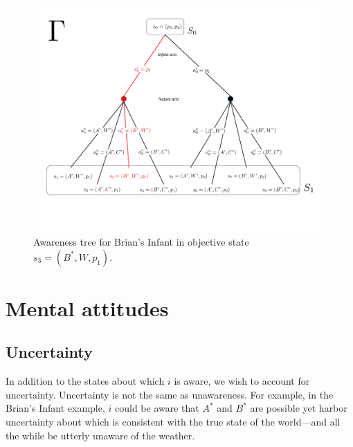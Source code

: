 \documentclass[
11pt,
titlepage,
reqno,
]{article}%
\theoremstyle{definition}
\begin{document}
{\begin{figure}[h!]
	\centering
	\includegraphics*[page=2,trim = 0in 0in 0in 0in,scale=.6]{Awareness_Diagrams_All}
	\caption{Awareness tree for Brian's Infant in objective state $s_{3}=(B^\ast,W,p_1)$.\label{Diag: p-02}}%
\end{figure}
}

	
\section{Mental attitudes}
	
\subsection{Uncertainty}
	
In addition to the states about which $i$ is aware, we wish to account for uncertainty. 
Uncertainty is not the same as unawareness.
For example, in the Brian's Infant example, $i$ could be aware that $A^\ast$ and $B^\ast$ are possible yet harbor uncertainty about which is consistent with the true state of the world---and all the while be utterly unaware of the weather.
\end{document}
